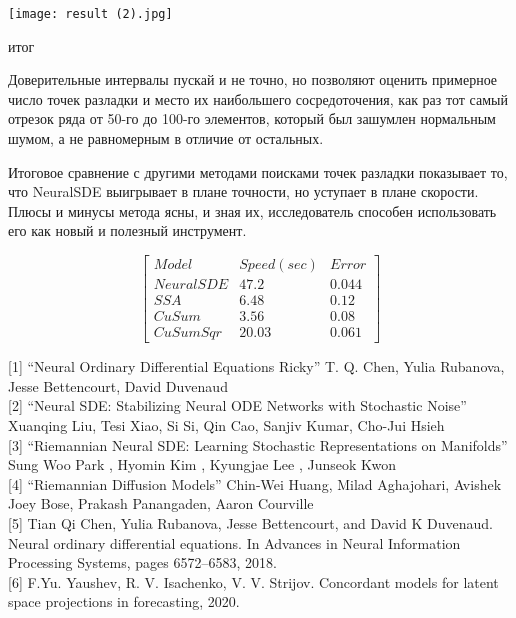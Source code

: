 \documentclass{article}
\begin{document}
   \centering
   \texttt{[image: result (2).jpg]}
   \caption{итог}
   \label{fig:galaxy}

   \par Доверительные интервалы пускай и не точно, но позволяют оценить примерное число точек разладки и место их наибольшего сосредоточения, как раз тот самый отрезок ряда от 50-го до 100-го элементов, который был зашумлен нормальным шумом, а не равномерным в отличие от остальных.

   \par Итоговое сравнение с другими методами поисками точек разладки показывает то, что NeuralSDE выигрывает в плане точности, но уступает в плане скорости. Плюсы и минусы метода ясны, и зная их, исследователь способен использовать его как новый и полезный инструмент.

   \begin{equation}
 \begin{bmatrix}
   Model & Speed(sec) & Error  \\
   Neural SDE & 47.2 & 0.044 \\
   SSA  & 6.48  & 0.12  \\
   CuSum & 3.56 & 0.08 \\
   CuSumSqr & 20.03 & 0.061
 \end{bmatrix}
\end{equation}





[1] “Neural Ordinary Differential Equations Ricky” T. Q. Chen, Yulia Rubanova, Jesse Bettencourt, David Duvenaud \\

[2] “Neural SDE: Stabilizing Neural ODE Networks with Stochastic Noise” Xuanqing Liu, Tesi Xiao, Si Si, Qin Cao, Sanjiv Kumar, Cho-Jui Hsieh  \\

[3] “Riemannian Neural SDE: Learning Stochastic Representations on Manifolds” Sung Woo Park , Hyomin Kim , Kyungjae Lee , Junseok Kwon \\

[4] “Riemannian Diffusion Models” Chin-Wei Huang, Milad Aghajohari, Avishek Joey Bose, Prakash Panangaden, Aaron Courville \\

[5] Tian Qi Chen, Yulia Rubanova, Jesse Bettencourt, and David K Duvenaud. Neural ordinary differential equations. In Advances in Neural Information Processing Systems, pages 6572–6583, 2018. \\

[6] F.Yu. Yaushev, R. V. Isachenko, V. V. Strijov. Concordant models for latent space projections in forecasting, 2020. \\
\end{document}
